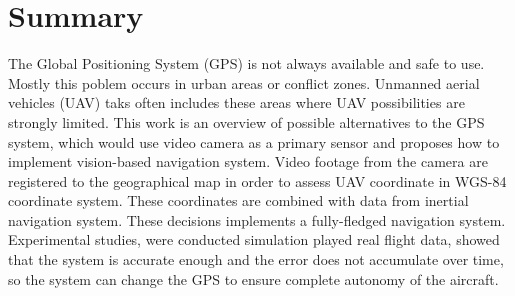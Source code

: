 \documentclass[a4paper,12pt]{article}
\begin{document}
	\clearpage
	\section*{Summary}
		\thispagestyle{empty}

		The Global Positioning System (GPS) is not always available and safe to use. Mostly this poblem occurs in urban areas or conflict zones.
		Unmanned aerial vehicles (UAV) taks often includes these areas where UAV possibilities are strongly limited. This work is an overview of possible alternatives to the GPS system, which would use video camera as a primary sensor and proposes how to implement vision-based navigation system.
		Video footage from the camera are registered to the geographical map in order to assess UAV coordinate in WGS-84 coordinate system. These coordinates are combined with data from inertial navigation system. These decisions implements a fully-fledged navigation system.
		Experimental studies, were conducted simulation played real flight data, showed that the system is accurate enough and the error does not accumulate over time, so the system can change the GPS to ensure complete autonomy of the aircraft.
\end{document}
